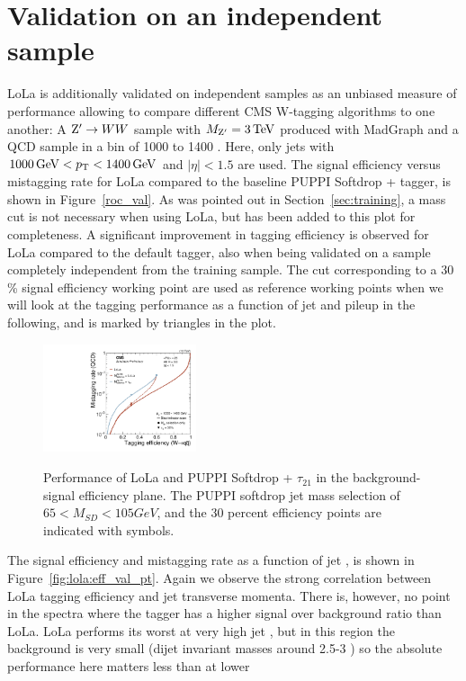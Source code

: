 \section{Validation on an independent sample}
\label{sec:validation}
LoLa is additionally validated on independent samples as an unbiased measure of performance allowing to compare different CMS W-tagging algorithms to one another: A $\mathrm{Z}^\prime \rightarrow WW$ sample with $M_{\mathrm{Z}^\prime}=3\,\text{Te\hspace{-.08em}V}$ produced with MadGraph and a QCD  sample in a \PT bin of 1000 to 1400 \GeV. Here, only jets with $ 1000 \,\text{Ge\hspace{-.08em}V} < p_{\mathrm{T}} < 1400 \,\text{Ge\hspace{-.08em}V}$ and $|\eta| < 1.5$ are used. The signal efficiency versus mistagging rate for LoLa compared to the baseline PUPPI Softdrop + \nsubj tagger, is shown in Figure~\ref{roc_val}. As was pointed out in Section~\ref{sec:training}, a mass cut is not necessary when using LoLa, but has been added to this plot for completeness. A significant improvement in tagging efficiency is observed for LoLa compared to the default tagger, also when being validated on a sample completely independent from the training sample. The cut corresponding to a 30 \% signal efficiency working point are used as reference working points when we will look at the tagging performance as a function of jet \PT and pileup in the following, and is marked by triangles in the plot.
\begin{figure}[htb]
\centering
\includegraphics[width=0.4\textwidth]{figures/vtagging/AN-18-099/validation/roc_ZpWqqvsQCD.pdf}\\
\caption{Performance of LoLa and PUPPI Softdrop + $\tau_{21}$ in the background-signal efficiency plane. The PUPPI softdrop jet mass
selection of $65 < M_{SD} < 105 GeV$, and the 30 percent efficiency points are indicated with symbols.}
\label{fig:roc_val}
\end{figure}
The signal efficiency and mistagging rate as a function of jet \PT, is shown in Figure~\ref{fig:lola:eff_val_pt}. Again we observe the strong correlation between LoLa tagging efficiency and jet transverse momenta. There is, however, no point in the spectra where the \nsubj tagger has a higher signal over background ratio than LoLa. LoLa performs its worst at very high jet \PT, but in this region the background is very small (dijet invariant masses around 2.5-3 \TeV) so the absolute performance here matters less than at lower \PT

